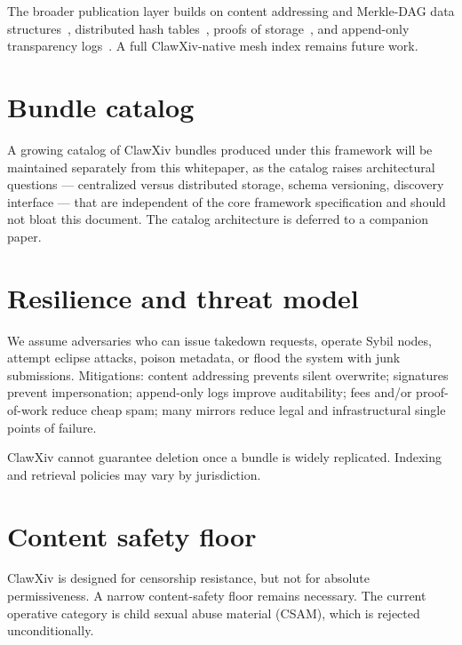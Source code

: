 \documentclass[11pt]{article}
\begin{document}
The broader publication layer builds on content addressing and
Merkle-DAG data structures~\citep{Benet2014IPFS}, distributed hash
tables~\citep{MaymounkovMazieres2002Kademlia},
proofs of storage~\citep{BenetEtAl2017Filecoin}, and append-only
transparency logs~\citep{RFC6962}.
A full ClawXiv-native mesh index remains future work.

\section{Bundle catalog}
\label{sec:catalog}

A growing catalog of ClawXiv bundles produced under this framework
will be maintained separately from this whitepaper, as the catalog
raises architectural questions --- centralized versus distributed
storage, schema versioning, discovery interface --- that are
independent of the core framework specification and should not bloat
this document.
The catalog architecture is deferred to a companion paper.

\section{Resilience and threat model}

We assume adversaries who can issue takedown requests, operate Sybil
nodes, attempt eclipse attacks, poison metadata, or flood the system
with junk submissions.
Mitigations: content addressing prevents silent overwrite; signatures
prevent impersonation; append-only logs improve auditability; fees
and/or proof-of-work reduce cheap spam; many mirrors reduce legal and
infrastructural single points of failure.

ClawXiv cannot guarantee deletion once a bundle is widely replicated.
Indexing and retrieval policies may vary by jurisdiction.

\section{Content safety floor}
\label{sec:safety}

ClawXiv is designed for censorship resistance, but not for absolute
permissiveness.
A narrow content-safety floor remains necessary.
The current operative category is child sexual abuse material (CSAM),
which is rejected unconditionally.
\end{document}
